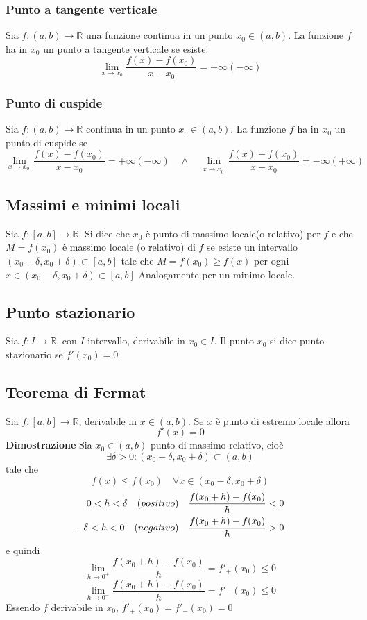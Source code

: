 \documentclass[12pt]{article}
\begin{document}
\subsubsection{Punto a tangente verticale}
Sia $f: (a,b) \to \mathbb{R}$ una funzione continua in un punto $x_0 \in (a,b)$. La funzione $f$ ha in $x_0$ un punto a tangente verticale se esiste:
\[ \lim_{x \to x_0} \frac{f(x) - f(x_0)}{x - x_0} = +\infty(-\infty) \]

\subsubsection{Punto di cuspide}
Sia $f: (a,b) \to \mathbb{R}$ continua in un punto $x_0 \in (a,b)$. La funzione $f$ ha in $x_0$
un punto di cuspide se
\[ \lim_{x \to x_{0}^{-}} \frac{f(x) - f(x_0)}{x - x_0} = +\infty(-\infty)
\quad \wedge \quad
\lim_{x \to x_{0}^{+}} \frac{f(x) - f(x_0)}{x - x_0} = -\infty(+\infty)\]

\subsection{Massimi e minimi locali}
Sia $f: [a,b] \to \mathbb{R}$. Si dice che $x_0$
è punto di massimo locale(o relativo) per $f$ e che
$M = f(x_0)$ è massimo locale (o relativo) di $f$ se
esiste un intervallo $(x_0 - \delta, x_0 + \delta) \subset [a,b]$
tale che $M = f(x_0) \geq f(x)$
per ogni $x \in (x_0 - \delta, x_0 + \delta) \subset [a,b]$
Analogamente per un minimo locale.

\subsection{Punto stazionario}
Sia $f: I \to \mathbb{R}$, con $I$ intervallo, derivabile in $x_0 \in I$.
Il punto $x_0$ si dice punto stazionario se $f'(x_0) = 0$

\subsection{Teorema di Fermat}
Sia $f: [a,b] \to \mathbb{R}$, derivabile in $x \in (a,b)$.
Se $x$ è punto di estremo locale allora
\[f'(x) = 0\]
\textbf{Dimostrazione}\newline
Sia $x_0 \in (a,b)$ punto di massimo relativo, cioè
\[
\exists \delta > 0: (x_0 - \delta, x_0 + \delta) \subset (a,b)
\]
tale che
\[
f(x) \leq f(x_0)\quad \forall x \in (x_0 - \delta, x_0 + \delta)
\]
\[ \begin{aligned} 
\quad 0 < h < \delta \text \quad {(positivo)} \quad \frac{f(x_0 +h) - f(x_0)}{h}<0 \\ 
 -\delta <h<0 \text \quad {(negativo)} \quad \frac{f(x_0 +h) - f(x_0)}{h}>0 
\end{aligned} \] 
e quindi
\[ 
\lim_{h \to 0^+} \frac{f(x_0 +h) - f(x_0)}{h} = f'_{+}(x_0) \leq 0 
\]
\[ 
\lim_{h \to 0^-} \frac{f(x_0 +h) - f(x_0)}{h} = f'_{-}(x_0) \leq 0 
\]
Essendo $f$ derivabile in $x_0$, $f'_{+}(x_0) = f'_{-}(x_0) = 0$
\end{document}
